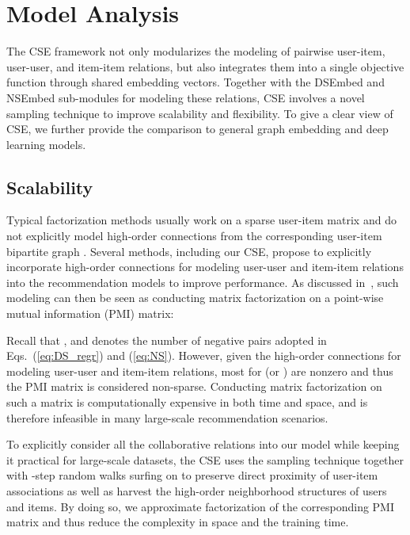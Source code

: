 \documentclass[sigconf,anonymous=false]{acmart}
\begin{document}
\section{Model Analysis}\label{sec:analysis}

The CSE framework not only modularizes the modeling of pairwise user-item,
user-user, and item-item relations, but also integrates them into a single
objective function through shared embedding vectors.
Together with the DSEmbed and NSEmbed sub-modules for modeling
these relations, CSE involves a novel sampling technique to 
improve scalability and flexibility.
To give a clear view of CSE, we further provide the comparison to general graph
embedding and deep learning models. 


\subsection{Scalability}
Typical factorization methods usually work on a sparse user-item matrix and do
not explicitly model high-order connections from the corresponding user-item
bipartite graph .
Several methods, including our CSE, propose to explicitly incorporate
high-order connections for modeling user-user and item-item relations into the
recommendation models to improve performance.
As discussed in~\cite{embedmf,cofactor,w2v}, such modeling can then be seen as
conducting matrix factorization on a  point-wise mutual
information (PMI) matrix:

Recall that , and  denotes the number of negative pairs adopted
in Eqs.~(\ref{eq:DS_regr}) and (\ref{eq:NS}).
However, given the high-order connections for modeling
user-user and item-item relations, most  for 
(or ) are nonzero and thus the PMI matrix is considered
non-sparse. Conducting matrix factorization on such a matrix is
computationally expensive in both time and space, and is therefore
infeasible in many large-scale recommendation scenarios.

To explicitly consider all the collaborative relations into our model while keeping
it practical for large-scale datasets, the CSE uses the
sampling technique together with -step random walks surfing on  to
preserve direct proximity of user-item associations as well as harvest the
high-order neighborhood structures of users and items.
By doing so, we approximate factorization of the corresponding PMI matrix and
thus reduce the complexity in space and the training time.
\end{document}
